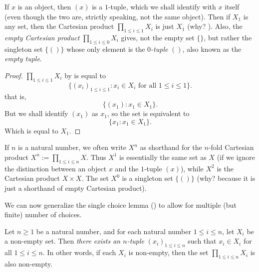 \begin{example} \label{example 3.5.11}
If \(x\) is an object, then \((x)\) is a \(1\)-tuple, which we shall identify with \(x\) itself (even though the two are, strictly speaking, not the same object).
Then if \(X_1\) is any set, then the Cartesian product \(\prod_{1 \leq i \leq 1} X_i\) is just \(X_1\) (why? ).
Also, the \emph{empty Cartesian product} \(\prod_{1 \leq i \leq 0} X_i\) gives, not the empty set \(\{\}\), but rather the singleton set \(\{()\}\) whose only element is the \emph{\(0\)-tuple} \(()\), also known as the \emph{empty tuple}.
\end{example}

\begin{proof} 
\(\prod_{1 \leq i \leq 1} X_i\) by  is equal to
\[
    \{ (x_i)_{1 \leq i \leq 1} : x_i \in X_i \text{\ for all \(1 \leq i \leq 1\)} \}.
\]
that is,
\[
    \{ (x_1) : x_1 \in X_1 \}.
\]
But we shall identify \((x_1)\) as \(x_1\), so the set is equivalent to
\[
    \{ x_1 : x_1 \in X_1 \}.
\]
Which is equal to \(X_1\).
\end{proof}

\begin{note}
If \(n\) is a natural number, we often write \(X^n\) as shorthand for the \(n\)-fold Cartesian product \(X^n := \prod_{1 \leq i \leq n} X\).
Thus \(X^1\) is essentially the same set as \(X\) (if we ignore the distinction between an object \(x\) and the \(1\)-tuple \((x)\)), while \(X^2\) is the Cartesian product \(X \times X\).
The set \(X^0\) is a singleton set \(\{()\}\) (why? because it is just a shorthand of empty Cartesian product).
\end{note}

We can now generalize the single choice lemma () to allow for multiple (but finite) number of choices.

\begin{lemma}  \label{lem 3.5.12}
Let \(n \geq 1\) be a natural number, and for each natural number \(1 \leq i \leq n\), let \(X_i\) be a non-empty set.
Then \emph{there exists an \(n\)-tuple} \((x_i)_{1 \leq i \leq n}\) such that \(x_i \in X_i\) for all \(1 \leq i \leq n\).
In other words, if each \(X_i\) is non-empty, then the set \(\prod_{1 \leq i \leq n} X_i\) is also non-empty.
\end{lemma}

